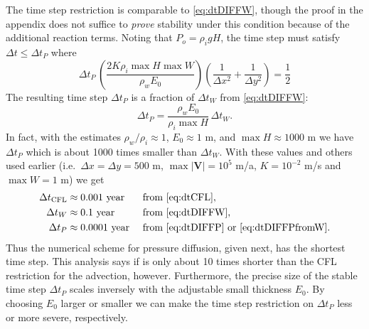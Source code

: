 \documentclass[11pt,final]{amsart}%
\newcommand\bV{\mathbf{V}}
\begin{document}
The time step restriction is comparable to \eqref{eq:dtDIFFW}, though the proof in the appendix does not suffice to \emph{prove} stability under this condition because of the additional reaction terms.  Noting that $P_o=\rho_i g H$, the time step must satisfy $\Delta t \le \Delta t_P$ where
\begin{equation}
\Delta t_P\, \left(\frac{2 K \rho_i \max H \max W}{\rho_w E_0}\right) \left(\frac{1}{\Delta x^2} + \frac{1}{\Delta y^2}\right) = \frac{1}{2} \label{eq:dtDIFFP}
\end{equation}
The resulting time step $\Delta t_P$ is a fraction of $\Delta t_W$ from \eqref{eq:dtDIFFW}:
\begin{equation}
\Delta t_P = \frac{\rho_w E_0}{\rho_i \max H}\, \Delta t_W.  \label{eq:dtDIFFPfromW}
\end{equation}
In fact, with the estimates $\rho_w/\rho_i \approx 1$, $E_0\approx 1$ m, and $\max H \approx 1000$ m we have $\Delta t_P$ which is about 1000 times smaller than $\Delta t_W$.  With these values and others used earlier (i.e.~$\Delta x = \Delta y = 500$ m, $\max |\bV|=10^5$ m/a, $K=10^{-2}$ m/s and $\max W=1$ m) we get
\begin{align*}
  \Delta t_{\text{CFL}} &\approx 0.001  \text{ year} &&\text{ from \eqref{eq:dtCFL}}, \\
  \Delta t_W            &\approx 0.1    \text{ year} &&\text{ from \eqref{eq:dtDIFFW}}, \\
  \Delta t_P            &\approx 0.0001 \text{ year} &&\text{ from \eqref{eq:dtDIFFP} or \eqref{eq:dtDIFFPfromW}.}
\end{align*}
Thus the numerical scheme for pressure diffusion, given next, has the shortest time step.  This analysis says if is only about 10 times shorter than the CFL restriction for the advection, however.  Furthermore, the precise size of the stable time step $\Delta t_P$ scales inversely with the adjustable small thickness $E_0$.  By choosing $E_0$ larger or smaller we can make the time step restriction on $\Delta t_P$ less or more severe, respectively.
\end{document}
